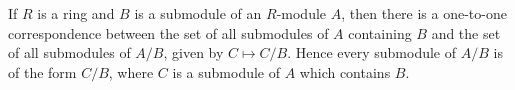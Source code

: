 If $R$ is a ring and $B$ is a submodule of an $R$-module $A$, then there is a one-to-one correspondence between the set of all submodules of $A$ containing $B$ and the set of all submodules of $A/B$, given by $C \mapsto C/B$. Hence every submodule of $A/B$ is of the form $C/B$, where $C$ is a submodule of $A$ which contains $B$.
